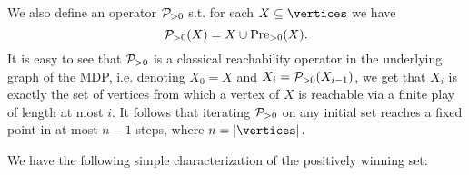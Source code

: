 \noindent
We also define an operator $\mathcal{P}_{>0}$ s.t. for each $X\subseteq\vertices$ we have
$$\mathcal{P}_{>0}(X) = X\cup \text{Pre}_{>0}(X).$$
It is easy to see that $\mathcal{P}_{>0}$ is a classical 
reachability operator in the underlying graph of the MDP, i.e. denoting $X_0 = 
X$ and $X_i = \mathcal{P}_{>0}(X_{i-1})$, we get that $X_i$ is exactly the set of 
vertices from which a vertex of $X$ is reachable via a finite play of length at 
most $i$. It follows that iterating $\mathcal{P}_{>0}$ on any initial set reaches a 
fixed point in at most $n-1$ steps, where $n=|\vertices|$.

We have the following simple characterization of the positively winning set:


